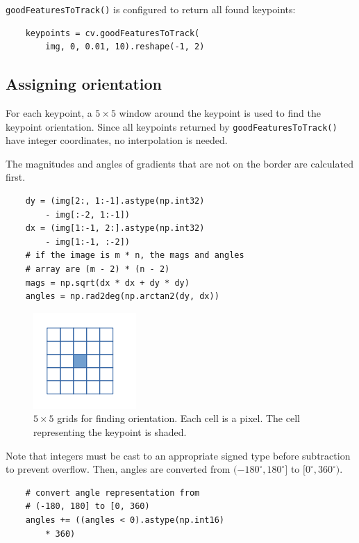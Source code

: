 \documentclass{ee208report}
\begin{document}
\begin{multicols*}{2}
\texttt{goodFeaturesToTrack()} is configured to return all found keypoints:

\begin{verbatim}
    keypoints = cv.goodFeaturesToTrack(
        img, 0, 0.01, 10).reshape(-1, 2)
\end{verbatim}

\subsection{Assigning orientation}

For each keypoint, a $5 \times 5$ window around the keypoint is used to find the
keypoint orientation. Since all keypoints returned by
\texttt{goodFeaturesToTrack()} have integer coordinates, no interpolation is
needed.

The magnitudes and angles of gradients that are not on the border are calculated
first.

\begin{verbatim}
    dy = (img[2:, 1:-1].astype(np.int32)
        - img[:-2, 1:-1])
    dx = (img[1:-1, 2:].astype(np.int32)
        - img[1:-1, :-2])
    # if the image is m * n, the mags and angles
    # array are (m - 2) * (n - 2)
    mags = np.sqrt(dx * dx + dy * dy)
    angles = np.rad2deg(np.arctan2(dy, dx))
\end{verbatim}

\begin{figure}[H]
    \centering
    \includegraphics{images/keypoint_window.png}
    \caption{$5 \times 5$ grids for finding orientation. Each cell is a pixel.
        The cell representing the keypoint is shaded.}
    \label{fig:keypoint-window}
\end{figure}

Note that integers must be cast to an appropriate signed type before subtraction
to prevent overflow. Then, angles are converted from
$(-180^\circ, 180^\circ]$ to $[0^\circ, 360^\circ)$.

\begin{verbatim}
    # convert angle representation from
    # (-180, 180] to [0, 360)
    angles += ((angles < 0).astype(np.int16)
        * 360)
\end{verbatim}




\end{multicols*}
\end{document}
